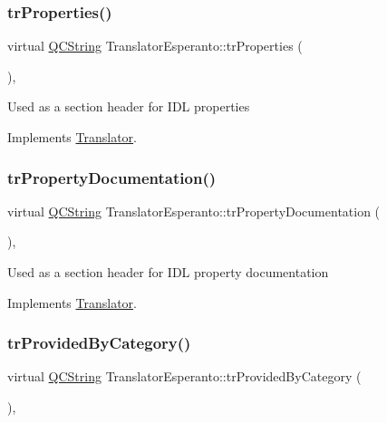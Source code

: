 \subsubsection{\texorpdfstring{trProperties()}{trProperties()}}
{\footnotesize\ttfamily virtual \mbox{\hyperlink{class_q_c_string}{Q\+C\+String}} Translator\+Esperanto\+::tr\+Properties (\begin{DoxyParamCaption}{ }\end{DoxyParamCaption})\hspace{0.3cm}{\ttfamily [inline]}, {\ttfamily [virtual]}}

Used as a section header for I\+DL properties 

Implements \mbox{\hyperlink{class_translator}{Translator}}.

\mbox{\label{class_translator_esperanto_a3192b87132574e06385fdc85d2803122}} 
\subsubsection{\texorpdfstring{trPropertyDocumentation()}{trPropertyDocumentation()}}
{\footnotesize\ttfamily virtual \mbox{\hyperlink{class_q_c_string}{Q\+C\+String}} Translator\+Esperanto\+::tr\+Property\+Documentation (\begin{DoxyParamCaption}{ }\end{DoxyParamCaption})\hspace{0.3cm}{\ttfamily [inline]}, {\ttfamily [virtual]}}

Used as a section header for I\+DL property documentation 

Implements \mbox{\hyperlink{class_translator}{Translator}}.

\mbox{\label{class_translator_esperanto_a0884c67bbbd62a57dff458c7e0bbccdc}} 
\subsubsection{\texorpdfstring{trProvidedByCategory()}{trProvidedByCategory()}}
{\footnotesize\ttfamily virtual \mbox{\hyperlink{class_q_c_string}{Q\+C\+String}} Translator\+Esperanto\+::tr\+Provided\+By\+Category (\begin{DoxyParamCaption}{ }\end{DoxyParamCaption})\hspace{0.3cm}{\ttfamily [inline]}, {\ttfamily [virtual]}}

